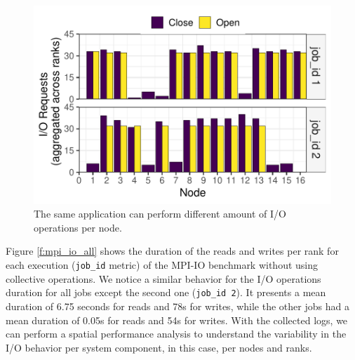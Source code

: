 \begin{figure}
	\centering
        \includegraphics[width=\linewidth]{figs/hacc_nfs_10.pdf}
	\caption{The same application can perform different amount of
          I/O operations per node.}
	\label{f:hacc2}
\end{figure}

Figure \ref{f:mpi_io_all} shows the duration of the reads and writes
per rank for each execution (\texttt{job\_id} metric) of the MPI-IO
benchmark without using collective operations. We notice a similar
behavior for the I/O operations duration for all jobs except the
second one (\texttt{job\_id 2}). It presents a mean duration of 6.75
seconds for reads and 78s for writes, while the other jobs had a mean
duration of 0.05s for reads and 54s for writes. With the collected
logs, we can perform a spatial performance analysis to understand the
variability in the I/O behavior per system component, in this case,
per nodes and ranks.
      
